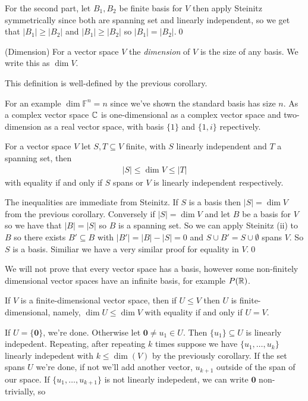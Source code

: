 \documentclass{article}
\newcommand{\F}{\mathbb{F}}
\begin{document}
For the second part, let $ B_1,B_2 $ be finite basis for $ V $ then apply Steinitz symmetrically since both are spanning set and linearly independent, so we get that $ |B_1|\ge |B_2| $ and $ |B_1|\ge |B_2| $ so $ |B_1|=|B_2| $.\qed
\begin{definition}
	(Dimension) For a vector space $ V $ the \textit{dimension} of $ V $ is the size of any basis. We write this as $\dim V$.
\end{definition}
This definition is well-defined by the previous corollary.\par
For an example $ \dim \F^n=n $ since we've shown the standard basis has size $ n $. As a complex vector space $ \mathbb{C} $ is one-dimensional as a complex vector space and two-dimension as a real vector space, with basis $ \{1\} $ and $ \{1,i\} $ repectively.
\begin{corollary}
  For a vector space $ V $ let $ S,T\subseteq V $ finite, with $ S $ linearly independent and $ T $ a spanning set, then
  \begin{align*}
	  |S|\le \dim V\le |T|
	  \end{align*}
	  with equality if and only if $ S $ spans or $ V $ is linearly independent respectively.
\end{corollary}
\pf The inequalities are immediate from Steinitz. If $ S $ is a basis then $ |S|=\dim V $ from the previous corollary. Conversely if $ |S|=\dim V $ and let $ B $ be a basis for $ V $ so we have that $ |B|=|S| $ so $ B $ is a spanning set. So we can apply Steinitz (ii) to $ B $ so there exists $ B'\subseteq B $ with $ |B'|=|B|-|S|=0 $ and $ S\cup B'=S\cup \emptyset $ spans $ V $. So $ S $ is a basis. Similiar we have a very similar proof for equality in $ V $.\qed\par We will not prove that every vector space has a basis, however some non-finitely dimensional vector spaces have an infinite basis, for example $ P(\mathbb{R}) $.
\begin{proposition}
  If $ V $ is a finite-dimensional vector space, then if $ U\le V $ then $ U $ is finite-dimensional, namely, $ \dim U \le \dim V $ with equality if and only if $ U=V $.
\end{proposition}
\pf If $ U=\{\mathbf 0\} $, we're done. Otherwise let $ \mathbf 0\ne u_1\in U $. Then $ \{u_1\}\subseteq U $ is linearly indepedent. Repeating, after repeating $ k $ times suppose we have $ \{u_1,\dots, u_k\} $ linearly indepedent with $ k\le \dim(V) $ by the previously corollary. If the set spans $ U $ we're done, if not we'll add another vector, $ u_{k+1} $ outside of the span of our space. If $ \{u_1,\dots, u_{k+1}\} $ is not linearly indepedent, we can write $ \mathbf 0 $ non-trivially, so
\end{document}
